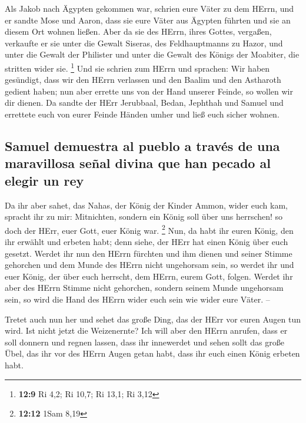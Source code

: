  Als Jakob nach Ägypten gekommen war, schrien eure Väter
zu dem HErrn, und er sandte Mose und Aaron, dass sie eure Väter aus
Ägypten führten und sie an diesem Ort wohnen ließen.  Aber
da sie des HErrn, ihres Gottes, vergaßen, verkaufte er sie unter die
Gewalt Siseras, des Feldhauptmanns zu Hazor, und unter die Gewalt der
Philister und unter die Gewalt des Königs der Moabiter, die stritten
wider sie. \footnote{\textbf{12:9} Ri 4,2; Ri 10,7; Ri 13,1; Ri 3,12}
 Und sie schrien zum HErrn und sprachen: Wir haben
gesündigt, dass wir den HErrn verlassen und den Baalim und den Astharoth
gedient haben; nun aber errette uns von der Hand unserer Feinde, so
wollen wir dir dienen.  Da sandte der HErr Jerubbaal,
Bedan, Jephthah und Samuel und errettete euch von eurer Feinde Händen
umher und ließ euch sicher wohnen.

\hypertarget{samuel-demuestra-al-pueblo-a-travuxe9s-de-una-maravillosa-seuxf1al-divina-que-han-pecado-al-elegir-un-rey}{%
\subsection{Samuel demuestra al pueblo a través de una maravillosa señal
divina que han pecado al elegir un
rey}\label{samuel-demuestra-al-pueblo-a-travuxe9s-de-una-maravillosa-seuxf1al-divina-que-han-pecado-al-elegir-un-rey}}

 Da ihr aber sahet, das Nahas, der König der Kinder
Ammon, wider euch kam, spracht ihr zu mir: Mitnichten, sondern ein König
soll über uns herrschen! so doch der HErr, euer Gott, euer König war.
\footnote{\textbf{12:12} 1Sam 8,19}  Nun, da habt ihr
euren König, den ihr erwählt und erbeten habt; denn siehe, der HErr hat
einen König über euch gesetzt.  Werdet ihr nun den HErrn
fürchten und ihm dienen und seiner Stimme gehorchen und dem Munde des
HErrn nicht ungehorsam sein, so werdet ihr und euer König, der über euch
herrscht, dem HErrn, eurem Gott, folgen.  Werdet ihr aber
des HErrn Stimme nicht gehorchen, sondern seinem Munde ungehorsam sein,
so wird die Hand des HErrn wider euch sein wie wider eure Väter. --

 Tretet auch nun her und sehet das große Ding, das der
HErr vor euren Augen tun wird.  Ist nicht jetzt die
Weizenernte? Ich will aber den HErrn anrufen, dass er soll donnern und
regnen lassen, dass ihr innewerdet und sehen sollt das große Übel, das
ihr vor des HErrn Augen getan habt, dass ihr euch einen König erbeten
habt.

